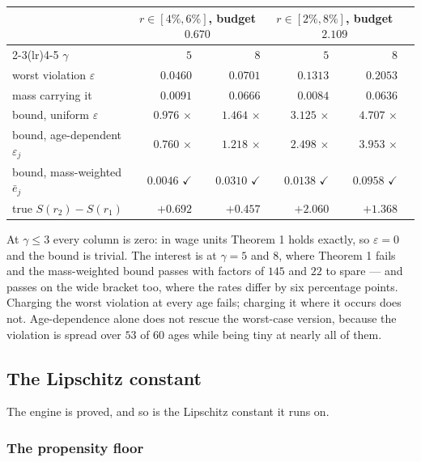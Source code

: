 \begin{center}
\begin{tabular}{lrrrrr}
\toprule
& \multicolumn{2}{c}{$r\in[4\%,6\%]$, budget $0.670$}
& \multicolumn{2}{c}{$r\in[2\%,8\%]$, budget $2.109$}\\
\cmidrule(lr){2-3}\cmidrule(lr){4-5}
$\gamma$ & $5$ & $8$ & $5$ & $8$\\
\midrule
worst violation $\varepsilon$ & $0.0460$ & $0.0701$ & $0.1313$ & $0.2053$\\
mass carrying it & $0.0091$ & $0.0666$ & $0.0084$ & $0.0636$\\
\midrule
bound, uniform $\varepsilon$ & $0.976$ $\times$ & $1.464$ $\times$ & $3.125$ $\times$ & $4.707$ $\times$\\
bound, age-dependent $\varepsilon_j$ & $0.760$ $\times$ & $1.218$ $\times$ & $2.498$ $\times$ & $3.953$ $\times$\\
bound, mass-weighted $\bar e_j$ & $\mathbf{0.0046}$ $\checkmark$ & $\mathbf{0.0310}$ $\checkmark$ & $\mathbf{0.0138}$ $\checkmark$ & $\mathbf{0.0958}$ $\checkmark$\\
\midrule
true $S(r_2)-S(r_1)$ & $+0.692$ & $+0.457$ & $+2.060$ & $+1.368$\\
\bottomrule
\end{tabular}
\end{center}

At $\gamma\le3$ every column is zero: in wage units Theorem 1 holds exactly, so $\varepsilon=0$ and
the bound is trivial. The interest is at $\gamma=5$ and $8$, where Theorem 1 fails and the
mass-weighted bound passes with factors of $145$ and $22$ to spare --- and passes on the wide
bracket too, where the rates differ by six percentage points. Charging the worst violation at every
age fails; charging it where it occurs does not. Age-dependence alone does not rescue the worst-case
version, because the violation is spread over $53$ of $60$ ages while being tiny at nearly all of
them.

\subsection{The Lipschitz constant}

The engine is proved, and so is the Lipschitz constant it runs on.

\subsubsection*{The propensity floor}

